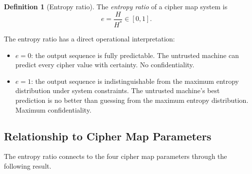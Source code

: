 \documentclass[11pt]{article}
\theoremstyle{definition}
\newtheorem{definition}{Definition}[section]
\theoremstyle{plain}
\theoremstyle{remark}
\begin{document}
\begin{definition}[Entropy ratio]
\label{def:entropy-ratio}
The \emph{entropy ratio} of a cipher map system is
\begin{equation}
\label{eq:entropy-ratio}
e = \frac{H}{H^*} \in [0, 1].
\end{equation}
\end{definition}

The entropy ratio has a direct operational interpretation:

\begin{itemize}
\item $e = 0$: the output sequence is fully predictable.  The untrusted
  machine can predict every cipher value with certainty.  No
  confidentiality.

\item $e = 1$: the output sequence is indistinguishable from the maximum
  entropy distribution under system constraints.  The untrusted machine's
  best prediction is no better than guessing from the maximum entropy
  distribution.  Maximum confidentiality.
\end{itemize}

\subsection{Relationship to Cipher Map Parameters}

The entropy ratio connects to the four cipher map parameters through the
following result.
\end{document}
